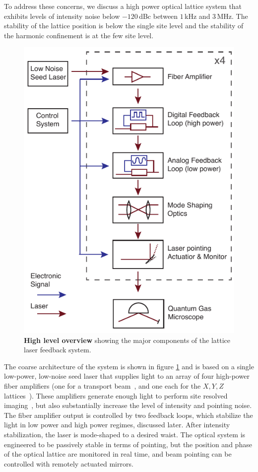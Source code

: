 \documentclass[twocolumn,aps,pra,showpacs,preprintnumbers,bibnotes]{revtex4-1}
\begin{document}
To address these concerns, we discuss a high power optical lattice system that exhibits levels of intensity noise below $-120\,$dBc between $1\,$kHz and $3\,$MHz.
The stability of the lattice position is below the single site level and the stability of the harmonic confinement is at the few site level.
\begin{figure}
  \begin{center}
    \includegraphics{fig/figure1/figure1.pdf}
    \caption{\textbf{High level overview} showing the major components of the lattice laser feedback system.}\label{fig:high_level}
  \end{center}
\end{figure}

The coarse architecture of the system is shown in figure \ref{fig:high_level} and is based on a single low-power, low-noise seed laser that supplies light to an array of four high-power fiber amplifiers (one for a transport beam~\cite{Huber2014}, and one each for the $X,Y,Z$ lattices~\cite{Parsons2016}).
These amplifiers generate enough light to perform site resolved imaging~\cite{Parsons2015}, but also substantially increase the level of intensity and pointing noise. 
The fiber amplifier output is controlled by two feedback loops, which stabilize the light in low power and high power regimes, discussed later.
After intensity stabilization, the laser is mode-shaped to a desired waist.
The optical system is engineered to be passively stable in terms of pointing, but the position and phase of the optical lattice are monitored in real time, and beam pointing can be controlled with remotely actuated mirrors.
\end{document}
